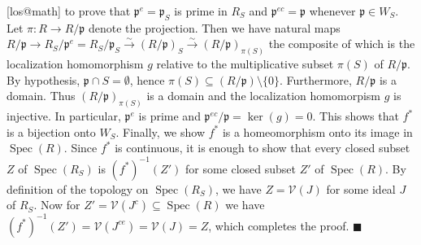 \documentclass{article}
\makeatletter
\newcommand\<{\triangleleft}
\newcommand\p{\mathfrak{p}}
\DeclareMathOperator{\spec}{Spec}
\newcommand{\V}{\mathcal{V}}
\newenvironment{solution}[1]{\def\x{#1}\begin{trivlist}\item[]\hspace*{-.5em}[\x]}
                {\hspace*{\fill} $\blacksquare$
                \protected@write0{}{\currentEx, \x}
                \end{trivlist}}
\makeatother
\begin{document}
\begin{solution}{los@math}
   to prove that $\p^e=\p_S$ is prime in $R_S$ and $\p^{ec}=\p$ whenever $\p \in W_S$.
   Let $\pi : R \rightarrow R/\p$ denote the projection. Then we have natural maps
   $R/\p \rightarrow R_S/\p^e = R_S/\p_S \stackrel{\sim}{\longrightarrow} (R/\p)_S
   \stackrel{\sim}{\longrightarrow} (R/\p)_{\pi(S)}$ the composite of which is the
   localization homomorphism $g$ relative to the multiplicative subset $\pi(S)$ of
   $R/\p$. By hypothesis, $\p \cap S = \emptyset$, hence $\pi(S) \subseteq
   (R/\p) \setminus \{0\}$. Furthermore, $R/\p$ is a domain. Thus $(R/\p)_{\pi(S)}$
   is a domain and the localization homomorpism $g$ is injective. In particular,
   $\p^e$ is prime and $\p^{ec}/\p = \ker(g) = 0$. This shows that $f^*$ is a bijection
   onto $W_S$. Finally, we show $f^*$ is a homeomorphism onto its image in $\spec(R)$.
   Since $f^*$ is continuous, it is enough to show that every closed subset $Z$ of
   $\spec(R_S)$ is $(f^*)^{-1}(Z')$ for some closed subset $Z'$ of $\spec(R)$.
   By definition of the topology on $\spec(R_S)$, we have $Z=\V(J)$ for some ideal
   $J$ of $R_S$. Now for $Z' = \V(J^c) \subseteq \spec(R)$ we have $(f^*)^{-1}(Z')
   = \V(J^{ce}) = \V(J) = Z$, which completes the proof.
 \end{solution}
\end{document}
